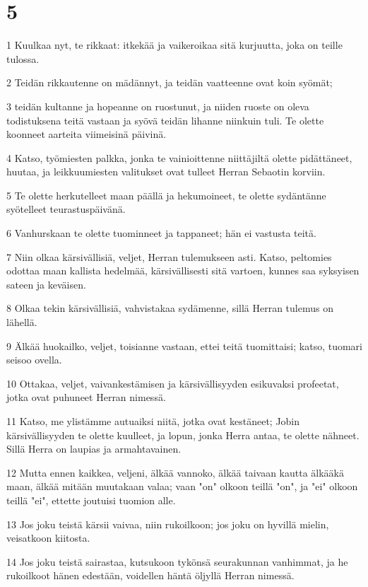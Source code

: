 \chapter{5}

\par 1 Kuulkaa nyt, te rikkaat: itkekää ja vaikeroikaa sitä kurjuutta, joka on teille tulossa.
\par 2 Teidän rikkautenne on mädännyt, ja teidän vaatteenne ovat koin syömät;
\par 3 teidän kultanne ja hopeanne on ruostunut, ja niiden ruoste on oleva todistuksena teitä vastaan ja syövä teidän lihanne niinkuin tuli. Te olette koonneet aarteita viimeisinä päivinä.
\par 4 Katso, työmiesten palkka, jonka te vainioittenne niittäjiltä olette pidättäneet, huutaa, ja leikkuumiesten valitukset ovat tulleet Herran Sebaotin korviin.
\par 5 Te olette herkutelleet maan päällä ja hekumoineet, te olette sydäntänne syötelleet teurastuspäivänä.
\par 6 Vanhurskaan te olette tuominneet ja tappaneet; hän ei vastusta teitä.
\par 7 Niin olkaa kärsivällisiä, veljet, Herran tulemukseen asti. Katso, peltomies odottaa maan kallista hedelmää, kärsivällisesti sitä vartoen, kunnes saa syksyisen sateen ja keväisen.
\par 8 Olkaa tekin kärsivällisiä, vahvistakaa sydämenne, sillä Herran tulemus on lähellä.
\par 9 Älkää huokailko, veljet, toisianne vastaan, ettei teitä tuomittaisi; katso, tuomari seisoo ovella.
\par 10 Ottakaa, veljet, vaivankestämisen ja kärsivällisyyden esikuvaksi profeetat, jotka ovat puhuneet Herran nimessä.
\par 11 Katso, me ylistämme autuaiksi niitä, jotka ovat kestäneet; Jobin kärsivällisyyden te olette kuulleet, ja lopun, jonka Herra antaa, te olette nähneet. Sillä Herra on laupias ja armahtavainen.
\par 12 Mutta ennen kaikkea, veljeni, älkää vannoko, älkää taivaan kautta älkääkä maan, älkää mitään muutakaan valaa; vaan "on" olkoon teillä "on", ja "ei" olkoon teillä "ei", ettette joutuisi tuomion alle.
\par 13 Jos joku teistä kärsii vaivaa, niin rukoilkoon; jos joku on hyvillä mielin, veisatkoon kiitosta.
\par 14 Jos joku teistä sairastaa, kutsukoon tykönsä seurakunnan vanhimmat, ja he rukoilkoot hänen edestään, voidellen häntä öljyllä Herran nimessä.
